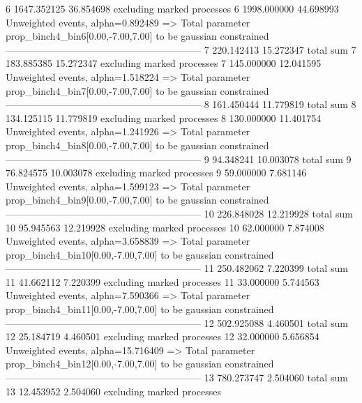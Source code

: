 6          1647.352125     36.854698       excluding marked processes    
6          1998.000000     44.698993       Unweighted events, alpha=0.892489
  => Total parameter prop_binch4_bin6[0.00,-7.00,7.00] to be gaussian constrained
------------------------------------------------------------
7          220.142413      15.272347       total sum                     
7          183.885385      15.272347       excluding marked processes    
7          145.000000      12.041595       Unweighted events, alpha=1.518224
  => Total parameter prop_binch4_bin7[0.00,-7.00,7.00] to be gaussian constrained
------------------------------------------------------------
8          161.450444      11.779819       total sum                     
8          134.125115      11.779819       excluding marked processes    
8          130.000000      11.401754       Unweighted events, alpha=1.241926
  => Total parameter prop_binch4_bin8[0.00,-7.00,7.00] to be gaussian constrained
------------------------------------------------------------
9          94.348241       10.003078       total sum                     
9          76.824575       10.003078       excluding marked processes    
9          59.000000       7.681146        Unweighted events, alpha=1.599123
  => Total parameter prop_binch4_bin9[0.00,-7.00,7.00] to be gaussian constrained
------------------------------------------------------------
10         226.848028      12.219928       total sum                     
10         95.945563       12.219928       excluding marked processes    
10         62.000000       7.874008        Unweighted events, alpha=3.658839
  => Total parameter prop_binch4_bin10[0.00,-7.00,7.00] to be gaussian constrained
------------------------------------------------------------
11         250.482062      7.220399        total sum                     
11         41.662112       7.220399        excluding marked processes    
11         33.000000       5.744563        Unweighted events, alpha=7.590366
  => Total parameter prop_binch4_bin11[0.00,-7.00,7.00] to be gaussian constrained
------------------------------------------------------------
12         502.925088      4.460501        total sum                     
12         25.184719       4.460501        excluding marked processes    
12         32.000000       5.656854        Unweighted events, alpha=15.716409
  => Total parameter prop_binch4_bin12[0.00,-7.00,7.00] to be gaussian constrained
------------------------------------------------------------
13         780.273747      2.504060        total sum                     
13         12.453952       2.504060        excluding marked processes    

